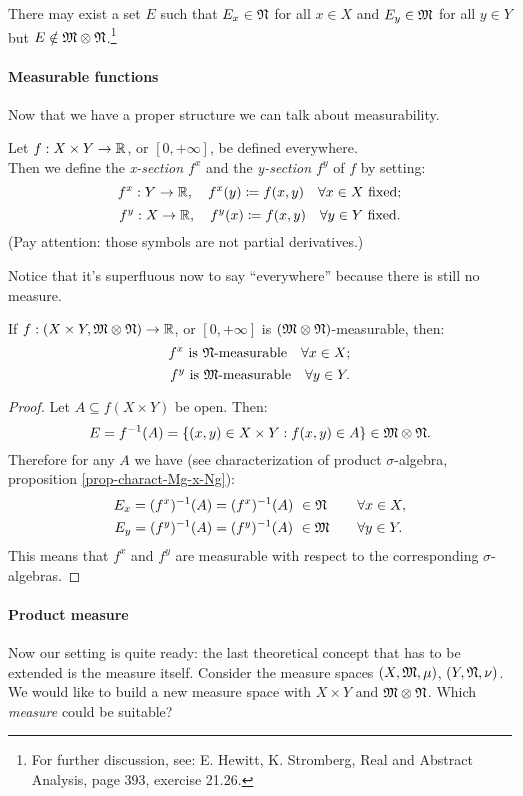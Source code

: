 There may exist a set $E$ such that $E_x \in \mathfrak N$ for all $x \in X$ and $E_y \in \mathfrak M$ for all $y \in Y$ but $E \notin \mathfrak M \otimes \mathfrak N$.\footnote{For further discussion, see: E. Hewitt, K. Stromberg, Real and Abstract Analysis, page 393, exercise 21.26.}

\paragraph{Measurable functions} Now that we have a proper structure we can talk about measurability.

\begin{defn}
	Let $f: X \times Y \to \mathbb R$, or $[0,+\infty]$, be defined everywhere.\\
	Then we define the \emph{x-section $f^x$} and the \emph{y-section $f^y$} of $f$ by setting:
	$$f^x:Y\to \mathbb R,\quad f^x(y) \coloneqq f(x,y)\quad \forall x \in X \text{ fixed};$$
	$$f^y:X\to \mathbb R,\quad f^y(x) \coloneqq f(x,y)\quad \forall y \in Y \text{ fixed}.$$
	(Pay attention: those symbols are not partial derivatives.)
\end{defn}
Notice that it's superfluous now to say ``everywhere'' because there is still no measure.

\begin{prop}
	If $f:(X \times Y, \mathfrak M \otimes \mathfrak N) \to \mathbb R$, or $[0, +\infty]$ is $(\mathfrak M \otimes \mathfrak N)$-measurable, then:
	$$f^x\text{ is }\mathfrak N\text{-measurable}\quad \forall x \in X;$$
	$$f^y\text{ is }\mathfrak M\text{-measurable}\quad \forall y \in Y.$$ 
\end{prop}
\begin{proof}
	Let $A \subseteq f(X \times Y)$ be open. Then:
	$$E = f^{-1}(A)=\{(x,y) \in X\times Y: f(x,y) \in A\} \in \mathfrak M \otimes \mathfrak N.$$
	Therefore for any $A$ we have (see characterization of product $\sigma$-algebra, proposition \vref{prop-charact-Mg-x-Ng}):
	\begin{alignat*}{2}
		E_x = (f^x)^{-1}(A) &= (f^x)^{-1}(A)\ \in \mathfrak N \quad &&\forall x \in X, \\
		E_y = (f^y)^{-1}(A) &= (f^y)^{-1}(A)\ \in \mathfrak M \quad &&\forall y \in Y.
	\end{alignat*}
	This means that $f^x$ and $f^y$ are measurable with respect to the corresponding $\sigma$-algebras.
\end{proof}


\paragraph{Product measure} Now our setting is quite ready: the last theoretical concept that has to be extended is the measure itself. Consider the measure spaces $(X,\mathfrak M, \mu)$, $(Y,\mathfrak N, \nu)$. We would like to build a new measure space with $X \times Y$ and $\mathfrak M \otimes \mathfrak N$. Which \textit{measure} could be suitable?

